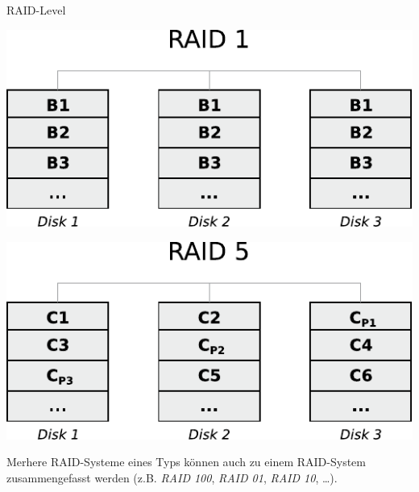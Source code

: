 \documentclass[german]{spicker}
\begin{document}
\begin{defi}{RAID-Level}
\begin{center}
        \includegraphics[]{images/raid1.pdf}

        \includegraphics[]{images/raid5.pdf}
    \end{center}

    Merhere RAID-Systeme eines Typs können auch zu einem RAID-System zusammengefasst werden (z.B. \emph{RAID 100}, \emph{RAID 01}, \emph{RAID 10}, \ldots).
\end{defi}
\end{document}

